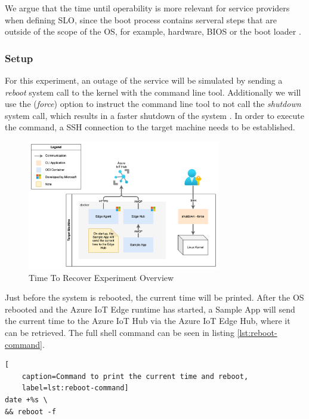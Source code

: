 We argue that the time until operability is more relevant for service providers
when defining \ac{SLO}, since the boot process contains serveral steps that are
outside of the scope of the \ac{OS}, for example, hardware, BIOS or the boot
loader \cite{almesberg}.

\subsubsection{Setup}
For this experiment, an outage of the service will be simulated by sending a
\textit{reboot} system call to the kernel with the 
command line tool. Additionally we will use the  (\textit{force}) option to
instruct the command line tool to not call the \textit{shutdown} system call,
which results in a faster shutdown of the system \cite{man-reboot}\cite{man-shutdown}.
In order to execute the command, a \ac{SSH} connection to the target machine
needs to be established.

\begin{figure}[H]
    \centering
    \includegraphics[width=0.75\textwidth]{fig/reboot-setup.drawio.png}
    \caption{Time To Recover Experiment Overview}
\end{figure}

\noindent
Just before the system is rebooted, the current time will be printed.
After the \ac{OS} rebooted and the Azure IoT Edge runtime has started, a
Sample App will send the current time to the Azure IoT Hub via the Azure IoT Edge
Hub, where it can be retrieved. The full shell command can be seen in listing
\ref{lst:reboot-command}.
\\

\begin{lstlisting}[
    caption=Command to print the current time and reboot,
    label=lst:reboot-command]
date +%s \
&& reboot -f
\end{lstlisting}

